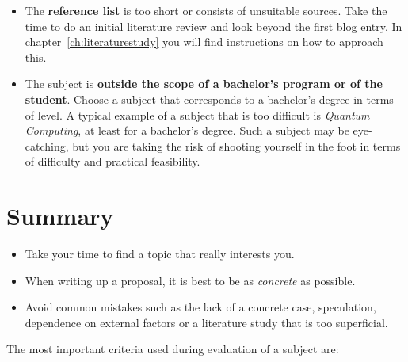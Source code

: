 \begin{itemize}
  \item The \textbf{reference list} is too short or consists of unsuitable sources. Take the time to do an initial literature review and look beyond the first blog entry. In chapter~\ref{ch:literaturestudy} you will find instructions on how to approach this.
  \item The subject is \textbf{outside the scope of a bachelor's program or of the student}. Choose a subject that corresponds to a bachelor's degree in terms of level. A typical example of a subject that is too difficult is \textit{Quantum Computing}, at least for a bachelor's degree. Such a subject may be eye-catching, but you are taking the risk of shooting yourself in the foot in terms of difficulty and practical feasibility.     
\end{itemize}

\section{Summary}
\label{sec:subjectsummary}

\begin{itemize}
 \item Take your time to find a topic that really interests you.
 \item When writing up a proposal, it is best to be as \emph{concrete} as possible.
 \item Avoid common mistakes such as the lack of a concrete case, speculation, dependence on external factors or a literature study that is too superficial.
\end{itemize}

The most important criteria used during evaluation of a subject are:

